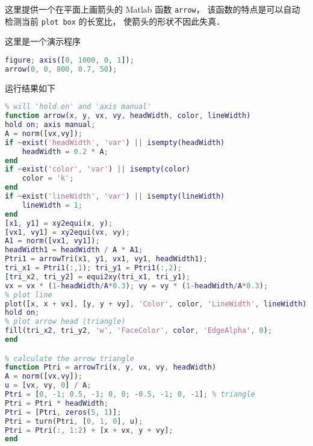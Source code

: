 
\begin{issues}
\issueDraft
\end{issues}

这里提供一个在平面上画箭头的 Matlab 函数 \verb|arrow|， 该函数的特点是可以自动检测当前 \verb|plot box| 的长宽比， 使箭头的形状不因此失真．

这里是一个演示程序
\begin{lstlisting}[language=matlab]
figure; axis([0, 1000, 0, 1]);
arrow(0, 0, 800, 0.7, 50);
\end{lstlisting}
运行结果如下

\begin{lstlisting}[language=matlab]
% plot arrow without distortion by getting current aspect ratio
% will 'hold on' and 'axis manual'
function arrow(x, y, vx, vy, headWidth, color, lineWidth)
hold on; axis manual;
A = norm([vx,vy]);
if ~exist('headWidth', 'var') || isempty(headWidth)
    headWidth = 0.2 * A;
end
if ~exist('color', 'var') || isempty(color)
    color = 'k';
end
if ~exist('lineWidth', 'var') || isempty(lineWidth)
    lineWidth = 1;
end
[x1, y1] = xy2equi(x, y);
[vx1, vy1] = xy2equi(vx, vy);
A1 = norm([vx1, vy1]);
headWidth1 = headWidth / A * A1;
Ptri1 = arrowTri(x1, y1, vx1, vy1, headWidth1);
tri_x1 = Ptri1(:,1); tri_y1 = Ptri1(:,2);
[tri_x2, tri_y2] = equi2xy(tri_x1, tri_y1);
vx = vx * (1-headWidth/A*0.3); vy = vy * (1-headWidth/A*0.3);
% plot line
plot([x, x + vx], [y, y + vy], 'Color', color, 'LineWidth', lineWidth);
hold on;
% plot arrow head (triangle)
fill(tri_x2, tri_y2, 'w', 'FaceColor', color, 'EdgeAlpha', 0);
end

% calculate the arrow triangle
function Ptri = arrowTri(x, y, vx, vy, headWidth)
A = norm([vx,vy]);
u = [vx, vy, 0] / A;
Ptri = [0, -1; 0.5, -1; 0, 0; -0.5, -1; 0, -1]; % triangle
Ptri = Ptri * headWidth;
Ptri = [Ptri, zeros(5, 1)];
Ptri = turn(Ptri, [0, 1, 0], u);
Ptri = Ptri(:, 1:2) + [x + vx, y + vy];
end
\end{lstlisting}

